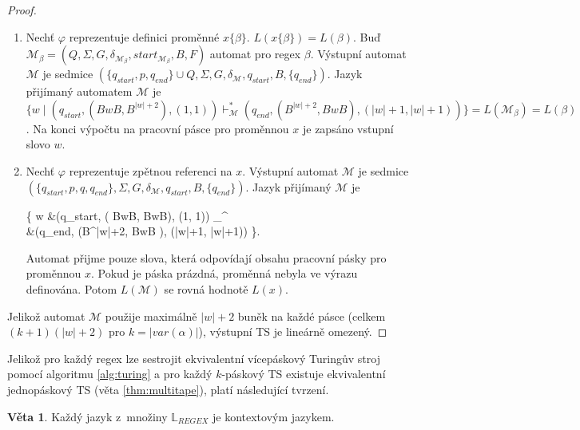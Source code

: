 \documentclass[thesis=B,czech]{FITthesis}[2019/12/23]
\theoremstyle{definition}
\newtheorem{theorem}{Věta}[chapter]
\begin{document}
\begin{proof}
\begin{enumerate}
{{		}
	}
	\item{Nechť $\varphi$ reprezentuje definici proměnné $x\{\beta\}$. $L(x\{\beta\})= L(\beta)$. Buď $\mathcal{M}_{\beta} = (Q, \Sigma, G, \delta_{\mathcal{M}_{\beta}}, start_{\mathcal{M}_{\beta}}, B, F)$ automat pro regex $\beta$. Výstupní automat $\mathcal{M}$ je sedmice $(\{q_{start}, p, q_{end}\}\cup Q, \Sigma, G, \delta_{\mathcal{M}}, q_{start}, B, \{q_{end}\})$. Jazyk přijímaný automatem $\mathcal{M}$ je $\{ w \mid \left(q_{start}, \left( BwB, B^{|w|+2}\right),  \left(1, 1\right)\right) \vdash_{\mathcal{M}}^\ast \left(q_{end}, \left(B^{|w|+2}, BwB \right),  \left(|w|+1, |w|+1 \right)\right) \} = L(\mathcal{M}_{\beta})= L(\beta)$. Na konci výpočtu na pracovní pásce pro proměnnou $x$ je zapsáno vstupní slovo $w$. 
	}
	\item{Nechť $\varphi$ reprezentuje zpětnou referenci na $x$. Výstupní automat $\mathcal{M}$ je sedmice $(\{q_{start}, p, q, q_{end}\}, \Sigma, G, \delta_{\mathcal{M}}, q_{start}, B, \{q_{end}\})$. Jazyk přijímaný $\mathcal{M}$ je \begin{flalign*}\{ w \mid &\left(q_{start}, \left( BwB, BwB\right),  \left(1, 1\right)\right) \vdash_{}^\ast \\&\left(q_{end}, \left(B^{|w|+2}, BwB \right),  (|w|+1, |w|+1)\right) \}.\end{flalign*} Automat přijme pouze slova, která odpovídají obsahu pracovní pásky pro proměnnou $x$. Pokud je páska prázdná, proměnná nebyla ve výrazu definována. Potom $L(\mathcal{M})$ se rovná hodnotě $L(x)$.}
\end{enumerate}
Jelikož automat $\mathcal{M}$ použije maximálně $|w|+2$ buněk na každé pásce (celkem $(k+1)(|w|+2)$ pro $k=|var(\alpha)|$), výstupní TS je lineárně omezený. 
\end{proof}

Jelikož pro každý regex lze sestrojit ekvivalentní vícepáskový Turingův stroj pomocí algoritmu \ref{alg:turing} a pro každý $k$-páskový TS existuje ekvivalentní jednopáskový TS (věta \ref{thm:multitape}), platí následující tvrzení.

\begin{theorem}
Každý jazyk z~množiny $\mathbb{L}_{REGEX} $ je kontextovým jazykem.
\end{theorem} 
\end{document}
